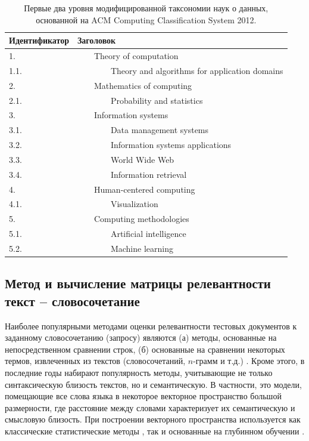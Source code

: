 \documentclass[12pt]{article}
\let\oldsubsection\subsection
\renewcommand{\subsection}{\clearpage\oldsubsection}
\begin{document}
\begin{table}[h]
	\def\arraystretch{1.}
	\centering
	\caption{Первые два уровня модифицированной таксономии наук о данных, основанной на ACM Computing Classification System 2012.}
	\label{table:acm_higher_ranks}
	\begin{tabular}{|l|l|}
		\hline
		Идентификатор & Заголовок                                             \\
		\hline
		1.             & ~~~~Theory of computation                             \\
		1.1.           & ~~~~~~~~Theory and algorithms for application domains \\
		2.             & ~~~~Mathematics of computing                          \\
		2.1.           & ~~~~~~~~Probability and statistics                    \\
		3.             & ~~~~Information systems                               \\
		3.1.           & ~~~~~~~~Data management systems                       \\
		3.2.           & ~~~~~~~~Information systems applications              \\
		3.3.           & ~~~~~~~~World Wide Web                                \\
		3.4.           & ~~~~~~~~Information retrieval                         \\
		4.             & ~~~~Human-centered computing                          \\
		4.1.           & ~~~~~~~~Visualization                                 \\
		5.             & ~~~~Computing methodologies                           \\
		5.1.           & ~~~~~~~~Artificial intelligence                       \\
		5.2.           & ~~~~~~~~Machine learning                              \\
		\hline
	\end{tabular}
\end{table}

	
\oldsubsection{Метод и вычисление матрицы релевантности текст -- словосочетание}

Наиболее популярными методами оценки релевантности тестовых документов к заданному словосочетанию (запросу) являются (а) методы, основанные на непосредственном сравнении строк, (б) основанные на сравнении некоторых термов, извлеченных из текстов (словосочетаний, $n$-грамм и т.д.) \cite{gomaa2013survey}. Кроме этого, в последние годы набирают популярность методы, учитывающие не только синтаксическую близость текстов, но и семантическую. В частности, это модели, помещающие все слова языка в некоторое векторное пространство большой размерности, где расстояние между словами характеризует их семантическую и смысловую близость. При построении векторного пространства используется как классические статистические методы \cite{Erk_2012}, так и основанные на глубинном обучении \cite{li2018word}.
\end{document}
